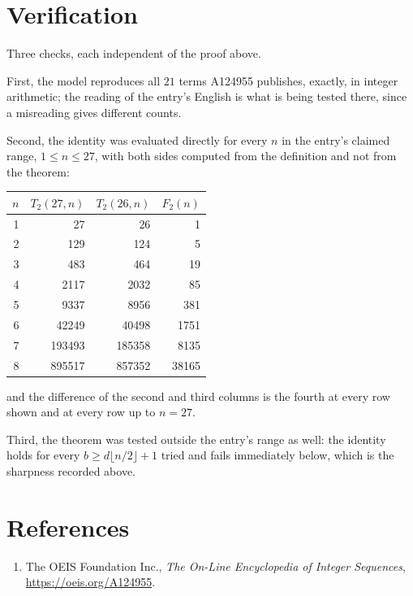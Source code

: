 \documentclass[11pt,a4paper]{article}
\theoremstyle{plain}
\theoremstyle{definition}
\begin{document}
\section{Verification}

Three checks, each independent of the proof above.

First, the model reproduces all $21$ terms A124955 publishes, exactly, in integer
arithmetic; the reading of the entry's English is what is being tested there, since a
misreading gives different counts.

Second, the identity was evaluated directly for every $n$ in the entry's claimed range,
$1\le n\le27$, with both sides computed from the definition and not from the theorem:

\begin{center}
\begin{tabular}{rrrr}
$n$ & $T_{2}(27,n)$ & $T_{2}(26,n)$ & $F_{2}(n)$ \\ \hline
1 & 27 & 26 & 1 \\
2 & 129 & 124 & 5 \\
3 & 483 & 464 & 19 \\
4 & 2117 & 2032 & 85 \\
5 & 9337 & 8956 & 381 \\
6 & 42249 & 40498 & 1751 \\
7 & 193493 & 185358 & 8135 \\
8 & 895517 & 857352 & 38165 \\
\end{tabular}
\end{center}

\noindent and the difference of the second and third columns is the fourth at every row shown
and at every row up to $n=27$.

Third, the theorem was tested outside the entry's range as well: the identity holds for every
$b\ge d\lfloor n/2\rfloor+1$ tried and fails immediately below, which is the sharpness recorded
above.

\section*{References}
\begin{enumerate}
\item The OEIS Foundation Inc., \emph{The On-Line Encyclopedia of Integer Sequences},
\url{https://oeis.org/A124955}.
\end{enumerate}
\end{document}
